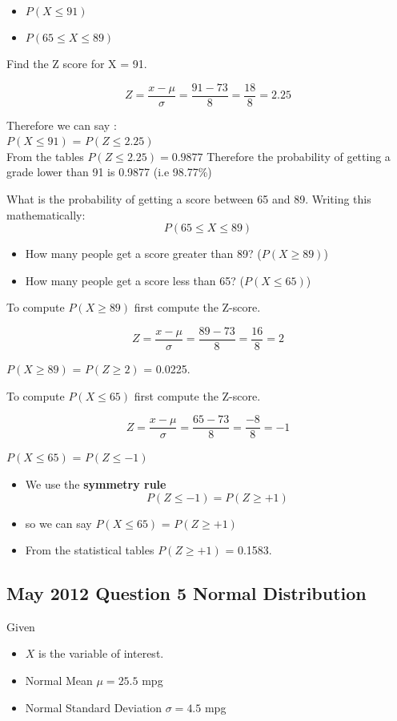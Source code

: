 \documentclass[]{report}
\begin{document}
\begin{itemize}
	\item $P(X \leq 91)$
	\item $P(65 \leq X \leq 89)$
\end{itemize}
Find the Z score for X = 91.

\[ Z = \frac{x- \mu}{ \sigma} = \frac{91 - 73}{8} =\frac{18}{8} = 2.25\]

Therefore we can say :\\ $P(X \leq 91)$ = $P(Z \leq 2.25)$ \\


From the tables $P(Z \leq 2.25) = 0.9877$
Therefore the probability of getting a grade lower than 91 is 0.9877 (i.e 98.77\%)


What is the probability of getting a score between 65 and 89.
Writing this mathematically:
\[ P(65 \leq X \leq 89) \]

\begin{itemize}
	\item How many people get a score greater than 89? ($P(X\geq 89)$)
	\item How many people get a score less than 65? ($P(X\leq 65)$)
\end{itemize}

To compute $P(X \geq 89)$ first compute the Z-score.

\[ Z = \frac{x - \mu}{\sigma} = \frac{89 - 73}{8} =\frac{16}{8} = 2 \]

$P(X \geq 89)$ = $P(Z \geq 2)$ = 0.0225.

To compute $P(X \leq 65)$ first compute the Z-score.

\[ Z = \frac{x - \mu}{\sigma} = \frac{65 - 73}{8} =\frac{-8}{8} = -1 \]

$P(X \leq 65)$ = $P(Z \leq -1)$ 

\begin{itemize}
	\item We use the \textbf{symmetry rule}
	\[ P(Z \leq -1) = P(Z \geq +1) \]
	\item so we can say $P(X \leq 65)$ = $P(Z \geq +1)$ 
	\item From the statistical tables $P(Z \geq +1)$ = 0.1583.
\end{itemize}



\subsection{May 2012 Question 5 Normal Distribution }
Given
\begin{itemize}
	\item $X$ is the variable of interest.
	\item Normal Mean $\mu =25.5$ mpg
	\item Normal Standard Deviation $\sigma =4.5$ mpg
\end{itemize}
\end{document}
